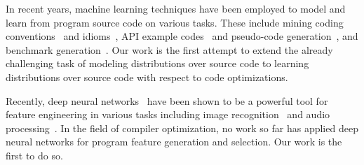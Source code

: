 
In recent years, machine learning techniques have been employed to model and learn from program source code on various tasks. These include mining coding conventions~\cite{Allamanis2014a} and idioms~\cite{Allamanis2014}, API example codes~\cite{Zhang2015a} and pseudo-code generation~\cite{Oda2015}, and benchmark generation~\cite{Cummins2017a}. Our work is the first attempt to extend the already challenging task of modeling distributions over source code to learning distributions over source code with respect to code optimizations.

Recently, deep neural networks~\cite{LeCun2015} have been shown to be a powerful tool for feature engineering in various tasks including image recognition~\cite{Krizhevsky2012,He2016} and audio processing~\cite{Lee2009b}. In the field of compiler optimization, no work so far has applied deep neural networks for program feature generation and selection. Our work is the first to do so.



